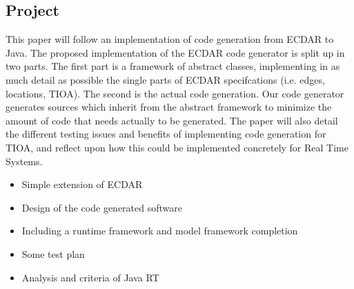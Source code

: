 \subsection{Project \label{introduction-problemfield}}
This paper will follow an implementation of code generation from ECDAR to Java. The proposed implementation of the ECDAR code generator is split up in two parts. The first part is a framework of abstract classes, implementing in as much detail as possible the single parts of ECDAR specifcations (i.e. edges, locations, TIOA). The second is the actual code generation. Our code generator generates sources which inherit from the abstract framework to minimize the amount of code that needs actually to be generated.
The paper will also detail the different testing issues and benefits of implementing code generation for TIOA, and reflect upon how this could be implemented concretely for Real Time Systems. 

\begin{itemize}
\item Simple extension of ECDAR
\item Design of the code generated software
\item Including a runtime framework and model framework completion
\item Some test plan
\item Analysis and criteria of Java RT
\end{itemize}
